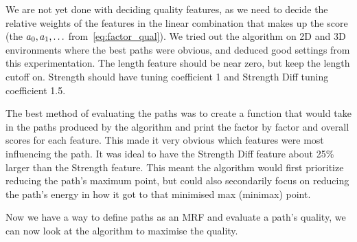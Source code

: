 We are not yet done with deciding quality features, as we need to decide the relative weights of the features in the linear combination that makes up the score (the $a_0, a_1, \mathellipsis$ from~\eqref{eq:factor_qual}).
We tried out the algorithm on 2D and 3D environments where the best paths were obvious, and deduced good settings from this experimentation.
The length feature should be near zero, but keep the length cutoff on.
Strength should have tuning coefficient 1 and Strength Diff tuning coefficient 1.5.

The best method of evaluating the paths was to create a function that would take in the paths produced by the algorithm and print the factor by factor and overall scores for each feature.
This made it very obvious which features were most influencing the path.
It was ideal to have the Strength Diff feature about 25\% larger than the Strength feature.
This meant the algorithm would first prioritize reducing the path's maximum point, but could also secondarily focus on reducing the path's energy in how it got to that minimised max (minimax) point.

Now we have a way to define paths as an MRF and evaluate a path's quality, we can now look at the algorithm to maximise the quality.

\FloatBarrier